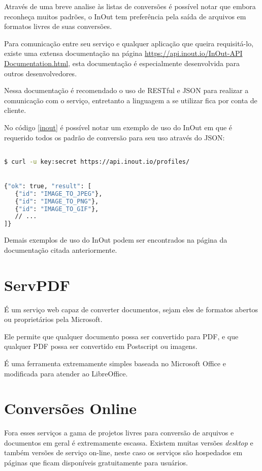 Através de uma breve analise às listas de conversões é possível notar que embora reconheça muitos padrões, o InOut tem preferência pela saída de arquivos em formatos livres de suas conversões.

Para comunicação entre seu serviço e qualquer aplicação que queira requisitá-lo, existe uma extensa documentação na página \url{https://api.inout.io/InOut-API Documentation.html}, esta documentação é especialmente desenvolvida para outros desenvolvedores.

Nessa documentação é recomendado o uso de RESTful e JSON para realizar a comunicação com o serviço, entretanto a linguagem a se utilizar fica por conta de cliente.

No código \ref{inout} é possível notar um exemplo de uso do InOut em que é requerido todos os padrão de conversão para seu uso através do JSON:

{\singlespace
\begin{lstlisting}[caption=Requisição de perfis do InOut,language=bash,label={inout}]

$ curl -u key:secret https://api.inout.io/profiles/


{"ok": true, "result": [
   {"id": "IMAGE_TO_JPEG"},
   {"id": "IMAGE_TO_PNG"},
   {"id": "IMAGE_TO_GIF"},
   // ...
]}
\end{lstlisting}
}

Demais exemplos de uso do InOut podem ser encontrados na página da documentação citada anteriormente.


\section{ServPDF}

É um serviço web capaz de converter documentos, sejam eles de formatos abertos ou proprietários pela Microsoft.

Ele permite que qualquer documento possa ser convertido para PDF, e que qualquer PDF possa ser convertido em Postscript ou imagens.

É uma ferramenta extremamente simples baseada no Microsoft Office e modificada para atender ao LibreOffice.


\section{Conversões Online}

Fora esses serviços a gama de projetos livres para conversão de arquivos e documentos em geral é extremamente escassa. Existem muitas versões \textit{desktop} e também versões de serviço on-line, neste caso os serviços são hospedados em páginas que ficam disponíveis gratuitamente para usuários.


